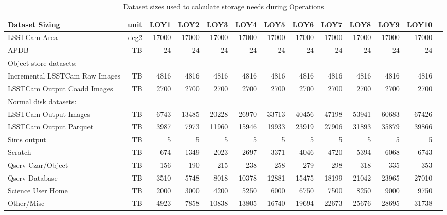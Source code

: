 \tiny \begin{longtable} { |p{}  |r  |r  |r  |r  |r  |r  |r  |r  |r  |r  |r  |r |} 
\caption{Dataset sizes used to calculate storage needs during Operations \label{tab:datasetSizingOps}}\\ 
\hline 
\textbf{Dataset Sizing}&\textbf{unit}&\textbf{LOY1}&\textbf{LOY2}&\textbf{LOY3}&\textbf{LOY4}&\textbf{LOY5}&\textbf{LOY6}&\textbf{LOY7}&\textbf{LOY8}&\textbf{LOY9}&\textbf{LOY10} \\ \hline
{LSSTCam Area}&{deg\^2}&{17000}&{17000}&{17000}&{17000}&{17000}&{17000}&{17000}&{17000}&{17000}&{17000} \\ \hline
{APDB}&{TB}&{24}&{24}&{24}&{24}&{24}&{24}&{24}&{24}&{24}&{24} \\ \hline
{Object store datasets:}&&&&&&&&&&& \\ \hline
{Incremental LSSTCam Raw Images}&{TB}&{4816}&{4816}&{4816}&{4816}&{4816}&{4816}&{4816}&{4816}&{4816}&{4816} \\ \hline
{LSSTCam Output Coadd Images}&{TB}&{2700}&{2700}&{2700}&{2700}&{2700}&{2700}&{2700}&{2700}&{2700}&{2700} \\ \hline
{Normal disk datasets:}&&&&&&&&&&& \\ \hline
{LSSTCam Output Images}&{TB}&{6743}&{13485}&{20228}&{26970}&{33713}&{40456}&{47198}&{53941}&{60683}&{67426} \\ \hline
{LSSTCam Output Parquet}&{TB}&{3987}&{7973}&{11960}&{15946}&{19933}&{23919}&{27906}&{31893}&{35879}&{39866} \\ \hline
{Sims output}&{TB}&{5}&{5}&{5}&{5}&{5}&{5}&{5}&{5}&{5}&{5} \\ \hline
{Scratch}&{TB}&{674}&{1349}&{2023}&{2697}&{3371}&{4046}&{4720}&{5394}&{6068}&{6743} \\ \hline
{Qserv Czar/Object}&{TB}&{156}&{190}&{215}&{238}&{258}&{279}&{298}&{318}&{335}&{353} \\ \hline
{Qserv Database}&{TB}&{3510}&{5748}&{8018}&{10378}&{12881}&{15475}&{18199}&{21042}&{23965}&{27010} \\ \hline
{Science User Home}&{TB}&{2000}&{3000}&{4200}&{5250}&{6000}&{6750}&{7500}&{8250}&{9000}&{9750} \\ \hline
{Other/Misc}&{TB}&{4923}&{7858}&{10838}&{13805}&{16740}&{19694}&{22673}&{25676}&{28695}&{31738} \\ \hline
\end{longtable} \normalsize
